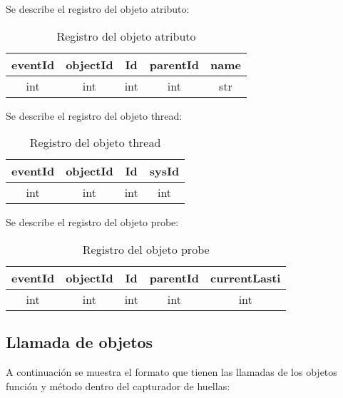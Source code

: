 \documentclass[10pt,a4paper]{article}
\begin{document}
Se describe el registro del objeto atributo:\\

\begin{table}[!h]
\begin{center}
\begin{tabular}{| c | c | c | c | c |}
\hline
eventId & objectId & Id & parentId & name\\
\hline
int & int & int & int & str\\
\hline
\end{tabular}
\caption{Registro del objeto atributo} 
\end{center}
\end{table}


Se describe el registro del objeto thread: \\

\begin{table}[!h]
\begin{center}
\begin{tabular}{| c | c | c | c |}
\hline
eventId & objectId & Id & sysId\\
\hline
int & int & int & int\\
\hline
\end{tabular}
\caption{Registro del objeto thread} 
\end{center}
\end{table}


Se describe el registro del objeto probe: \\

\begin{table}[!h]
\begin{center}
\begin{tabular}{| c | c | c | c | c |}
\hline
eventId & objectId & Id & parentId & currentLasti \\
\hline
int & int & int & int & int\\
\hline
\end{tabular}
\caption{Registro del objeto probe} 
\end{center}
\end{table}

\newpage
\subsection{Llamada de objetos}

A continuación se muestra el formato que tienen las llamadas de los objetos función y método dentro del capturador de huellas:\\
\end{document}
